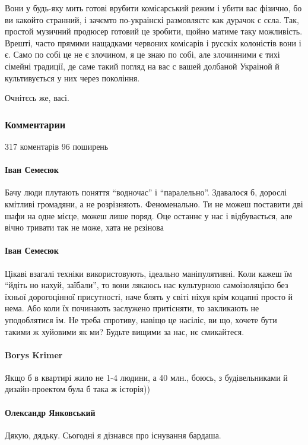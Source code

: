Вони у будь-яку мить готові врубити комісарський режим і убити вас фізично, бо
ви какойто странний, і зачємто по-украінскі размовляєтє как дурачок с сєла.
Так, простой музичний продюсер готовий це зробити, щойно матиме таку
можливість. Врешті, часто прямими нащадками червоних комісарів і русскіх
колоністів вони і є. Само по собі це не є злочином, я це знаю по собі, але
злочинними є тихі сімейні традиції, де саме такий погляд на вас с вашей
долбаной Украіной й культивується у них через покоління.

Очнітєсь же, васі.

\subsubsection{Комментарии}
317 коментарів 96 поширень

\paragraph{Іван Семесюк}

Бачу люди плутають поняття \enquote{водночас} і \enquote{паралельно}. Здавалося б, дорослі
кмітливі громадяни, а не розрізняють. Феноменально. Ти не можеш поставити дві
шафи на одне місце, можеш лише поряд. Оце останнє у нас і відбувається, але
вічно тривати так не може, хата не рєзінова

\paragraph{Іван Семесюк}

Цікаві взагалі техніки використовують, ідеально маніпулятивні. Коли кажеш їм
\enquote{йдіть но нахуй, заїбали}, то вони лякаюсь нас культурною самоізоляцією без
їхньої дорогоцінної присутності, наче блять у світі ніхуя крім коцапні просто й
нема. Або коли їх починають заслужено притісняти, то закликають не уподоблятися
їм. Не треба спротиву, навіщо це насіліє, ви що, хочете бути такими ж хуйовими
як ми? Будьте вищими за нас, нє смикайтеся.

\paragraph{Borys Krimer}
Якщо б в квартирі жило не 1-4 людини, а 40 млн., боюсь, з будівельниками й
дизайн-проектом була б така ж історія))

\paragraph{Олександр Янковський}
Дякую, дядьку. Сьогодні я дізнався про існування бардаша.

